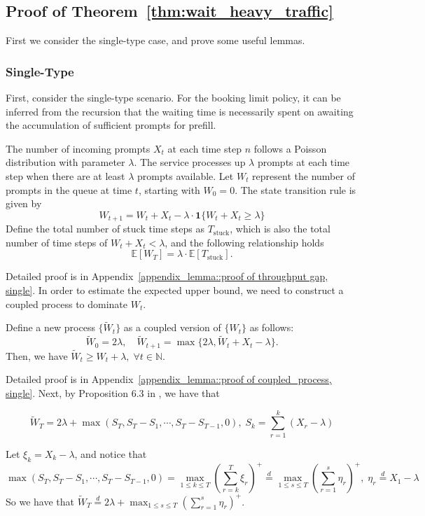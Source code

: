 \subsection{Proof of Theorem~\ref{thm:wait_heavy_traffic}}\label{appexidx::proof of wait_heavy_traffic}
First we consider the single-type case, and prove some useful lemmas.
\subsubsection{Single-Type}

First, consider the single-type scenario. For the booking limit policy, it can be inferred from the recursion that the waiting time is necessarily spent on awaiting the accumulation of sufficient prompts for prefill.
\begin{lemma}\label{lemma::throughput gap, single}
The number of incoming prompts $X_t$ at each time step $n$ follows a Poisson distribution with parameter $\lambda$. The service processes up $\lambda$ prompts at each time step when there are at least $\lambda$ prompts available. Let $W_t$ represent the number of prompts in the queue at time $t$, starting with $W_0=0$. The state transition rule is given by
$$W_{t+1}=W_t+X_t-\lambda\cdot \mathbf{1}\{W_t+X_t\geq \lambda\}$$
Define the total number of stuck time steps as $T_{\text{stuck}}$, which is also the total number of time steps of $W_t+X_t<\lambda$, and the following relationship holds
$$\mathbb{E}[W_T]= \lambda\cdot\mathbb{E}[T_{\text{stuck}}].$$
\end{lemma}
Detailed proof is in Appendix~\ref{appendix_lemma::proof of throughput gap, single}. In order to estimate the expected upper bound, we need to construct a coupled process to dominate $W_t$.

\begin{lemma}\label{lem:coupled_process, single}
Define a new process $\{\tilde{W}_t\}$ as a coupled version of $\{W_t\}$ as follows:
$$
\tilde{W}_0 = 2\lambda, \quad \tilde{W}_{t+1} = \max\{ 2\lambda, \tilde{W}_t + X_t - \lambda \}.
$$
Then, we have $\tilde{W}_t \geq W_t + \lambda, \;\forall t\in \mathbb{N}$.
\end{lemma}
Detailed proof is in Appendix~\ref{appendix_lemma::proof of coupled_process, single}. Next, by Proposition 6.3 in \cite{asmussen2003applied}, we have that 
\begin{lemma}
    $$\tilde{W}_T=2\lambda+\max(S_T, S_T-S_1,\cdots,S_T-S_{T-1},0),\; S_k=\sum_{r=1}^k (X_r-\lambda) $$
\end{lemma}
Let $\xi_k = X_k-\lambda$, and notice that 
$$\max(S_T, S_T-S_1,\cdots,S_T-S_{T-1},0)=\max_{1\leq k\leq T}(\sum_{r=k}^{T}\xi_r)^+\overset{d}{=}\max_{1\leq s\leq T}(\sum_{r=1}^{s}\eta_r)^+, \; \eta_r\overset{d}{=}X_1-\lambda$$
So we have that $\tilde{W}_T \overset{d}{=}2\lambda+\max_{1\leq s\leq T}(\sum_{r=1}^{s}\eta_r)^+ $. 

